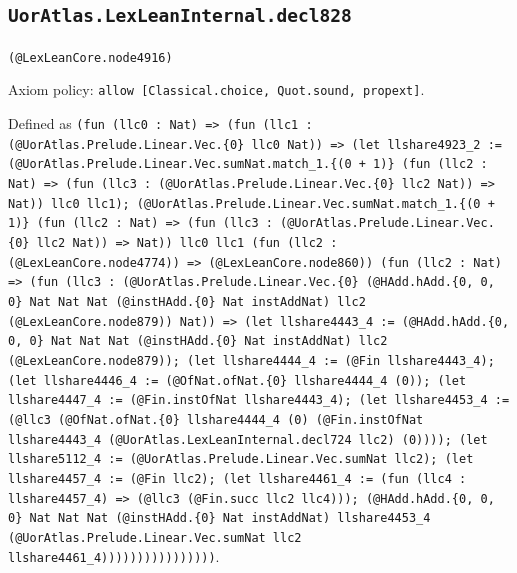 \documentclass[11pt]{article}
\begin{document}
\subsection*{\texttt{UorAtlas.LexLeanInternal.decl828}}
\noindent\texttt{(@LexLeanCore.node4916)}\par
\noindent Axiom policy: \texttt{allow [Classical.choice, Quot.sound, propext]}.\par
\noindent Defined as \texttt{(fun (llc0 : Nat) => (fun (llc1 : (@UorAtlas.Prelude.Linear.Vec.\{0\} llc0 Nat)) => (let llshare4923\_2 := (@UorAtlas.Prelude.Linear.Vec.sumNat.match\_1.\{(0 + 1)\} (fun (llc2 : Nat) => (fun (llc3 : (@UorAtlas.Prelude.Linear.Vec.\{0\} llc2 Nat)) => Nat)) llc0 llc1); (@UorAtlas.Prelude.Linear.Vec.sumNat.match\_1.\{(0 + 1)\} (fun (llc2 : Nat) => (fun (llc3 : (@UorAtlas.Prelude.Linear.Vec.\{0\} llc2 Nat)) => Nat)) llc0 llc1 (fun (llc2 : (@LexLeanCore.node4774)) => (@LexLeanCore.node860)) (fun (llc2 : Nat) => (fun (llc3 : (@UorAtlas.Prelude.Linear.Vec.\{0\} (@HAdd.hAdd.\{0, 0, 0\} Nat Nat Nat (@instHAdd.\{0\} Nat instAddNat) llc2 (@LexLeanCore.node879)) Nat)) => (let llshare4443\_4 := (@HAdd.hAdd.\{0, 0, 0\} Nat Nat Nat (@instHAdd.\{0\} Nat instAddNat) llc2 (@LexLeanCore.node879)); (let llshare4444\_4 := (@Fin llshare4443\_4); (let llshare4446\_4 := (@OfNat.ofNat.\{0\} llshare4444\_4 (0)); (let llshare4447\_4 := (@Fin.instOfNat llshare4443\_4); (let llshare4453\_4 := (@llc3 (@OfNat.ofNat.\{0\} llshare4444\_4 (0) (@Fin.instOfNat llshare4443\_4 (@UorAtlas.LexLeanInternal.decl724 llc2) (0)))); (let llshare5112\_4 := (@UorAtlas.Prelude.Linear.Vec.sumNat llc2); (let llshare4457\_4 := (@Fin llc2); (let llshare4461\_4 := (fun (llc4 : llshare4457\_4) => (@llc3 (@Fin.succ llc2 llc4))); (@HAdd.hAdd.\{0, 0, 0\} Nat Nat Nat (@instHAdd.\{0\} Nat instAddNat) llshare4453\_4 (@UorAtlas.Prelude.Linear.Vec.sumNat llc2 llshare4461\_4))))))))))))))))}.\par
\end{document}
